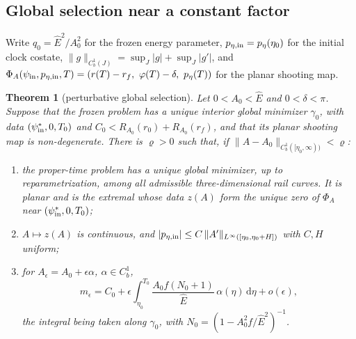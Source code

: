 \documentclass[aip,jmp,amsmath,amssymb,reprint]{revtex4-2}
\newcommand{\Ehat}{\hat E}
\newcommand{\dd}{\mathrm{d}}
\theoremstyle{plain}
\newtheorem{theorem}{Theorem}
\theoremstyle{definition}
\begin{document}
\subsection{Global selection near a constant factor}
Write $q_0=\Ehat^2/A_0^2$ for the frozen energy parameter, $p_{\eta,{\rm in}}=p_\eta(\eta_0)$ for the initial
clock costate, $\|g\|_{C^1_b(J)}=\sup_J|g|+\sup_J|g'|$, and
$\Phi_A(\psi_{\rm in},p_{\eta,{\rm in}},T)=(r(T)-r_f,\ \varphi(T)-\delta,\ p_\eta(T))$ for the planar shooting map.

\begin{theorem}[perturbative global selection]\label{thm:tau-P}
Let $0<A_0<\Ehat$ and $0<\delta<\pi$. Suppose that the frozen problem has a unique interior
global minimizer $\gamma_0$, with data $(\psi_{\rm in}^*,0,T_0)$ and
$C_0<R_{A_0}(r_0)+R_{A_0}(r_f)$, and that its planar shooting map is non-degenerate. There is
$\varrho>0$ such that, if $\|A-A_0\|_{C^1_b([\eta_0,\infty))}<\varrho$:
\begin{enumerate}
\item the proper-time problem has a unique global minimizer, up to reparametrization,
  among all admissible three-dimensional rail curves. It is planar and is the extremal
  whose data $z(A)$ form the unique zero of $\Phi_A$ near $(\psi_{\rm in}^*,0,T_0)$;
\item $A\mapsto z(A)$ is continuous, and
  $|p_{\eta,{\rm in}}|\le C\,\|A'\|_{L^\infty([\eta_0,\eta_0+H])}$ with $C,H$ uniform;
\item for $A_\epsilon=A_0+\epsilon\alpha$, $\alpha\in C^1_b$,
  \[
    m_\epsilon=C_0+\epsilon\int_{\eta_0}^{T_0}\frac{A_0f(N_0+1)}{\Ehat}\,\alpha(\eta)\,\dd\eta+o(\epsilon),
  \]
  the integral being taken along $\gamma_0$, with $N_0=(1-A_0^2f/\Ehat^2)^{-1}$.
\end{enumerate}
\end{theorem}
\end{document}
